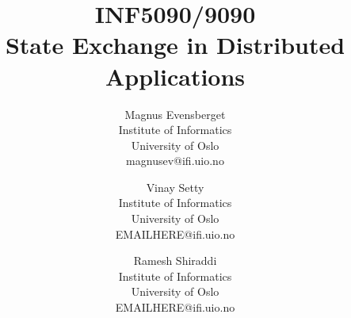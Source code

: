 \documentclass[12pt, conference, compsocconf, letterpaper]{IEEEtran}
\begin{document}
\title{INF5090/9090\\State Exchange in Distributed Applications}

%
%
%
%
%

%
\author{
	Magnus Evensberget\\
	Institute of Informatics\\
	University of Oslo\\
	magnusev@ifi.uio.no
\and
	Vinay Setty\\
	Institute of Informatics\\
	University of Oslo\\
	EMAILHERE@ifi.uio.no
\and
	Ramesh Shiraddi\\
	Institute of Informatics\\
	University of Oslo\\
	EMAILHERE@ifi.uio.no
}
\end{document}
